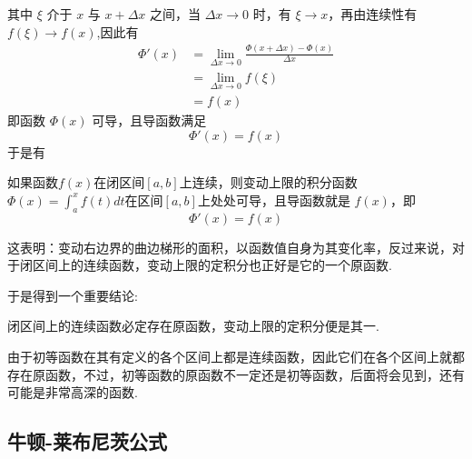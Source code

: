 其中 $\xi$ 介于 $x$ 与 $x+\Delta x$ 之间，当 $\Delta x \rightarrow 0$ 时，有 $\xi \rightarrow x$，再由连续性有 $f(\xi) \rightarrow f(x)$,因此有
\begin{equation*}
  \begin{split}
    \Phi'(x) & = \lim_{\Delta x \rightarrow 0}   \frac{\Phi(x+\Delta x)-\Phi(x)}{\Delta x} \\
    & = \lim_{\Delta x \rightarrow 0} f(\xi) \\
    & = f(x)
  \end{split}
\end{equation*}
即函数 $\Phi(x)$ 可导，且导函数满足
\[ \Phi'(x) = f(x) \]
于是有
\begin{theorem}
  如果函数$f(x)$在闭区间$[a,b]$上连续，则变动上限的积分函数$\Phi(x)=\int_a^xf(t)dt$在区间$[a,b]$上处处可导，且导函数就是 $f(x)$，即
  \[ \Phi'(x) = f(x) \]
\end{theorem}
这表明：变动右边界的曲边梯形的面积，以函数值自身为其变化率，反过来说，对于闭区间上的连续函数，变动上限的定积分也正好是它的一个原函数.

于是得到一个重要结论:
\begin{inference}
  闭区间上的连续函数必定存在原函数，变动上限的定积分便是其一.
\end{inference}

由于初等函数在其有定义的各个区间上都是连续函数，因此它们在各个区间上就都存在原函数，不过，初等函数的原函数不一定还是初等函数，后面将会见到，还有可能是非常高深的函数.


\subsection{牛顿-莱布尼茨公式}
\label{sec:newton-leibniz-formular}

